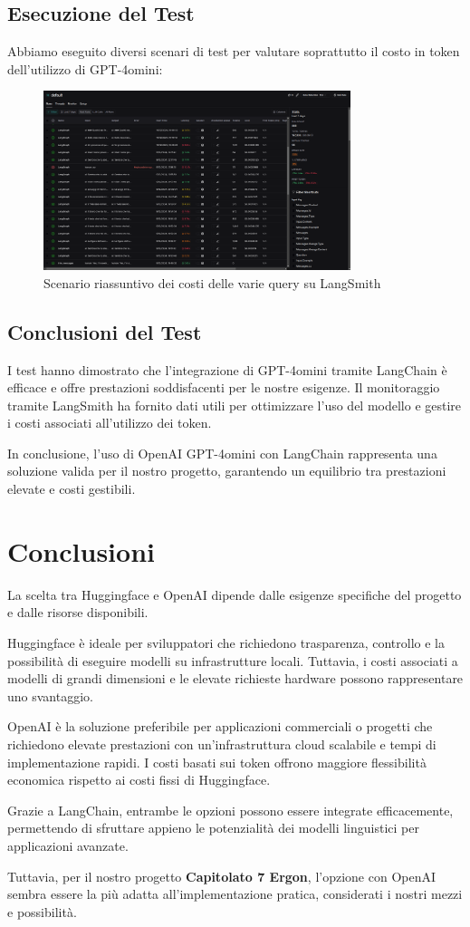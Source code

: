 \documentclass{article}
\begin{document}
\subsection{Esecuzione del Test}
Abbiamo eseguito diversi scenari di test per valutare soprattutto il costo in token dell'utilizzo di GPT-4omini:
\begin{figure}[H]
    \centering
    \includegraphics[width=0.8\textwidth]{img/testing_langsmith.png}
    \caption{Scenario riassuntivo dei costi delle varie query su LangSmith}
    \label{fig:LangSmith_costs_summary}
\end{figure}

\subsection{Conclusioni del Test}
I test hanno dimostrato che l'integrazione di GPT-4omini tramite LangChain è efficace e offre prestazioni soddisfacenti per le nostre esigenze. Il monitoraggio tramite LangSmith ha fornito dati utili per ottimizzare l'uso del modello e gestire i costi associati all'utilizzo dei token.

In conclusione, l'uso di OpenAI GPT-4omini con LangChain rappresenta una soluzione valida per il nostro progetto, garantendo un equilibrio tra prestazioni elevate e costi gestibili.

\section{Conclusioni}
La scelta tra Huggingface e OpenAI dipende dalle esigenze specifiche del progetto e dalle risorse disponibili.

Huggingface è ideale per sviluppatori che richiedono trasparenza, controllo e la possibilità di eseguire modelli su infrastrutture locali. Tuttavia, i costi associati a modelli di grandi dimensioni e le elevate richieste hardware possono rappresentare uno svantaggio.

OpenAI è la soluzione preferibile per applicazioni commerciali o progetti che richiedono elevate prestazioni con un'infrastruttura cloud scalabile e tempi di implementazione rapidi. I costi basati sui token offrono maggiore flessibilità economica rispetto ai costi fissi di Huggingface.

Grazie a LangChain, entrambe le opzioni possono essere integrate efficacemente, permettendo di sfruttare appieno le potenzialità dei modelli linguistici per applicazioni avanzate. 

Tuttavia, per il nostro progetto \textbf{Capitolato 7 Ergon}, l'opzione con OpenAI sembra essere la più adatta all'implementazione pratica, considerati i nostri mezzi e possibilità.
\end{document}
